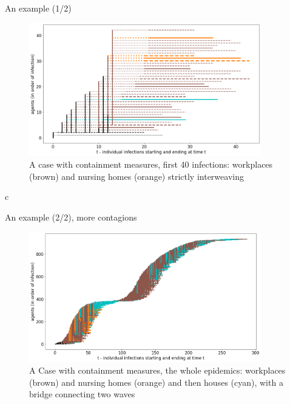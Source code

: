 \documentclass[8pt]{beamer}
\begin{document}
\begin{frame}{An example (1/2)}

\begin{figure}[H]
\center
\includegraphics[width=0.9\textwidth]{with8b40.png}%
\caption{A case with containment measures, first 40 infections: workplaces (brown) and nursing homes (orange) strictly interweaving}
\label{workplacesNursingHomes}
\end{figure}
c
\end{frame}

\begin{frame}{An example (2/2), more contagions}

\begin{figure}[H]
\center
\includegraphics[width=0.9\textwidth]{with8a.png}%
\caption{A Case with containment measures, the whole epidemics: workplaces (brown) and nursing homes (orange) and then houses (cyan), with a bridge connecting two waves}
\label{workplacesNursingHomes}
\end{figure}


\end{frame}
\end{document}
